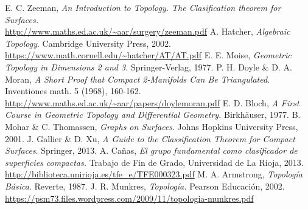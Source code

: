 \documentclass[GTS.tex]{subfiles}
\begin{document}
\renewcommand\chaptername{\Huge Tema}

\titleformat{\chapter}[display]
    {\normalfont\huge\bfseries}{\chaptertitlename\ \thechapter}{10pt}{\Huge}
\titlespacing*{\chapter}{0pt}{-1cm}{10pt}

\begin{thebibliography}{}
 E. C. Zeeman, \textit{An Introduction to Topology. The Clasification theorem for Surfaces.}\\ \url{http://www.maths.ed.ac.uk/~aar/surgery/zeeman.pdf}
 A. Hatcher, \textit{Algebraic Topology}. Cambridge University Press, 2002. \\ \url{https://www.math.cornell.edu/~hatcher/AT/AT.pdf}
 E. E. Moise, \textit{Geometric Topology in Dimensions 2 and 3. } Springer-Verlag, 1977.
 P. H. Doyle \& D. A. Moran, \textit{A Short Proof that Compact 2-Manifolds Can Be Triangulated.} Inventiones math. 5 (1968), 160-162. \\	    	\url{http://www.maths.ed.ac.uk/~aar/papers/doylemoran.pdf}
 E. D. Bloch, \textit{A First Course in Geometric Topology and Differential Geometry.} Birkhäuser, 1977.
 B. Mohar \& C. Thomassen, \textit{Graphs on Surfaces}. Johns Hopkins University Press, 2001.
 J. Gallier \& D. Xu, \textit{A Guide to the Classification Theorem for Compact Surfaces}. Springer, 2013.
\bibitem{} A. Cañas, \textit{El grupo fundamental como clasificador de superficies compactas.} Trabajo de Fin de Grado, Universidad de La Rioja, 2013. \url{http://biblioteca.unirioja.es/tfe_e/TFE000323.pdf}
\bibitem{} M. A. Armstrong, \textit{Topología Básica}. Reverte, 1987.
\bibitem{} J. R. Munkres, \textit{Topología.} Pearson Educación, 2002.\\ \url{https://psm73.files.wordpress.com/2009/11/topologia-munkres.pdf}
\end{thebibliography}
\end{document}
